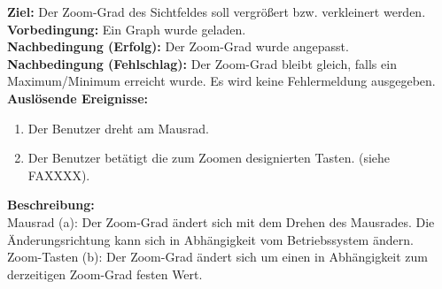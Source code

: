 \label{fa:zoom}
\textbf{Ziel:} Der Zoom-Grad des Sichtfeldes soll vergrößert bzw. verkleinert werden.\\
\textbf{Vorbedingung:} Ein Graph wurde geladen.\\
\textbf{Nachbedingung (Erfolg):} Der Zoom-Grad wurde angepasst.\\
\textbf{Nachbedingung (Fehlschlag):} Der Zoom-Grad bleibt gleich, falls ein Maximum/Minimum erreicht wurde. Es wird keine Fehlermeldung ausgegeben.\\
\textbf{Auslösende Ereignisse:}
\begin{enumerate}[nolistsep, label=(\alph*)]
  \item Der Benutzer dreht am Mausrad.
  \item Der Benutzer betätigt die zum Zoomen designierten Tasten. (siehe FAXXXX). %
\end{enumerate}
\textbf{Beschreibung:}\\
Mausrad (a): Der Zoom-Grad ändert sich mit dem Drehen des Mausrades. Die Änderungsrichtung kann sich in Abhängigkeit vom Betriebssystem ändern.\\
Zoom-Tasten (b): Der Zoom-Grad ändert sich um einen in Abhängigkeit zum derzeitigen Zoom-Grad festen Wert.\\

